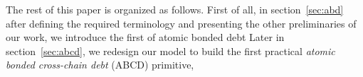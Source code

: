 







 
The rest of this paper is organized as follows. First of all, in section~\ref{sec:abd} after defining the required terminology and presenting the other preliminaries of our work, we introduce the first  of atomic bonded debt  Later in section~\ref{sec:abcd}, we redesign our model to build the first practical \emph{atomic bonded cross-chain debt} (ABCD) primitive, 



